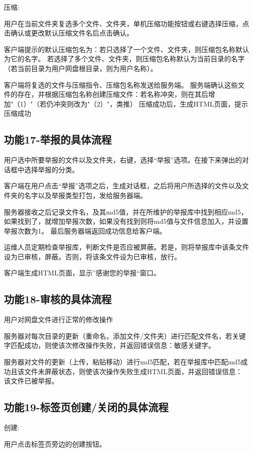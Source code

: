 压缩:

用户在当前文件夹复选多个文件、文件夹，单机压缩功能按钮或右键选择压缩，点击确认或更改默认压缩文件名后点击确认。

客户端提示的默认压缩包名为：若只选择了一个文件、文件夹，则压缩包名称默认为它的名字。
若选择了多个文件、文件夹，则压缩包名称默认为当前目录的名字（若当前目录为用户网盘根目录，则为用户名称）。

客户端将复选的文件与压缩指令、压缩包名称发送给服务端。
服务端确认这些文件的存在，并根据压缩包名称创建压缩文件：若名称冲突，则在其后增加"（1）"（若仍冲突则改为"（2）"，类推）
压缩成功后，生成HTML页面，提示压缩成功


\subsection{功能17-举报的具体流程}
用户选中所要举报的文件以及文件夹，右键，选择“举报”选项。在接下来弹出的对话框中选择举报的分类。

客户端在用户点击“举报”选项之后，生成对话框，之后将用户所选择的文件以及文件夹的名字以及举报类型打包，发给服务器端。

服务器接收之后记录文件名，及其md5值，并在所维护的举报库中找到相应md5，如果找到了，就增加举报次数，如果没有找到则将md5值与文件信息加入，并设置举报次数为1。
最后服务器端返回成功信息给客户端。

运维人员定期检查举报库，判断文件是否应被屏蔽。若是，则将举报库中该条文件设为已审核，屏蔽。否则，将该条文件设为已审核，放行。

客户端生成HTML页面，显示”感谢您的举报“窗口。

\subsection{功能18-审核的具体流程}
用户对网盘文件进行正常的修改操作

服务器对每次目录的更新（重命名，添加文件/文件夹）进行匹配文件名，若关键字匹配成功，则使该次修改操作失败，并返回错误信息：敏感关键字。

服务器对文件的更新（上传，粘贴移动）进行md5匹配，若在举报库中匹配md5成功且该文件未屏蔽状态，则使该次操作失败生成HTML页面，并返回错误信息：该文件已被举报。


\subsection{功能19-标签页创建/关闭的具体流程}
创建:

用户点击标签页旁边的创建按钮。

